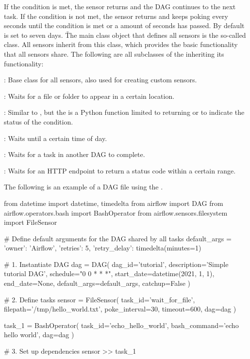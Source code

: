 If the condition is met, the sensor returns  and the DAG continues to the next task. If the condition is
not met, the sensor returns  and keeps poking every  seconds until the condition
is met or a  amount of seconds has passed. By default  is set to seven days. \v

The main class object that defines all sensors is the so-called  class. All sensors inherit
from this class, which provides the basic functionality that all sensors share. The following are all subclasses of
the  inheriting its functionality:
\bit
\item {}: Base class for all sensors, also used for creating custom sensors.
\item {}: Waits for a file or folder to appear in a certain location.
\item {}: Similar to , but the  is a Python function
limited to returning  or  to indicate the status of the condition.
\item {}: Waits until a certain time of day.
\item {}: Waits for a task in another DAG to complete.
\item {}: Waits for an HTTP endpoint to return a status code within a certain range.
\eit

\be
The following is an example of a DAG file using the .
\begin{block}
from datetime import datetime, timedelta
from airflow import DAG
from airflow.operators.bash import BashOperator
from airflow.sensors.filesystem import FileSensor

# Define default arguments for the DAG shared by all tasks
default_args = {
    'owner': 'Airflow',
    'retries': 5,
    'retry_delay': timedelta(minutes=1)
}

# 1. Instantiate DAG
dag = DAG(
    dag_id='tutorial',
    description='Simple tutorial DAG',
    schedule="0 0 * * *",
    start_date=datetime(2021, 1, 1),
    end_date=None,
    default_args=default_args,
    catchup=False
)

# 2. Define tasks
sensor = FileSensor(
    task_id='wait_for_file',
    filepath='/tmp/hello_world.txt',
    poke_interval=30,
    timeout=600,
    dag=dag
)

task_1 = BashOperator(
    task_id='echo_hello_world',
    bash_command='echo hello world',
    dag=dag
)

# 3. Set up dependencies
sensor >> task_1
\end{block}
\ee

